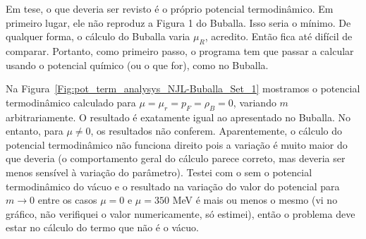 Em tese, o que deveria ser revisto é o próprio potencial termodinâmico. Em primeiro lugar, ele não reproduz a Figura 1 do Buballa\cite{Buballa1996}. Isso seria o mínimo. De qualquer forma, o cálculo do Buballa varia $\mu_R$, acredito. Então fica até difícil de comparar. Portanto, como primeiro passo, o programa tem que passar a calcular usando o potencial químico (ou o que for), como no Buballa.

Na Figura~\ref{Fig:pot_term_analysys_NJL-Buballa_Set_1} mostramos o potencial termodinâmico calculado para $\mu = \mu_r = p_F = \rho_B = 0$, variando $m$ arbitrariamente. O resultado é exatamente igual ao apresentado no Buballa. No entanto, para $\mu \neq 0$, os resultados não conferem. Aparentemente, o cálculo do potencial termodinâmico não funciona direito pois a variação é muito maior do que deveria (o comportamento geral do cálculo parece correto, mas deveria ser menos sensível à variação do parâmetro). Testei com o sem o potencial termodinâmico do vácuo e o resultado na variação do valor do potencial para $m \to 0$ entre os casos $\mu = 0$ e $\mu = 350$ MeV é mais ou menos o mesmo (vi no gráfico, não verifiquei o valor numericamente, só estimei), então o problema deve estar no cálculo do termo que não é o vácuo.

\begin{figure*}
	
	\caption{Gráfico do potencial termodinâmico $\tilde{\omega}$ obtido variando $m$ arbitrariamente, para o valor $\mu = \mu_R = 0$. \protect}
	\label{Fig:pot_term_analysys_NJL-Buballa_Set_1}
\end{figure*}

\begin{figure*}
	
	\caption{Gráfico do momento de Fermi $p_F$. \protect}
	\label{Fig:fermi_momentum_NJL-Buballa_Set_1}
\end{figure*}

\begin{figure*}
	
	\caption{Gráfico da equação cuja raíz determina o valor de $m_{\rm{vac}}$. \protect}
	\label{Fig:vacuum_mass_equation_NJL-Buballa_Set_1}
\end{figure*}

\begin{figure*}
	
	\caption{Gráfico da equação cuja raíz determina o valor de $m$ (``Equação do gap zerada''). \protect}
	\label{Fig:gap_NJL-Buballa_Set_1}
\end{figure*}

